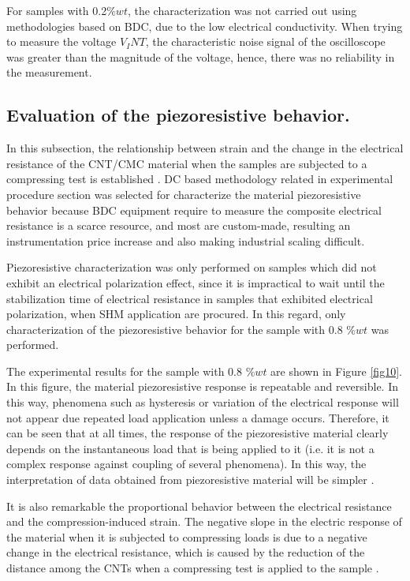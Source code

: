 \documentclass[twocolumn]{bmcart}%
\begin{document}
For samples with 0.2$\%wt$, the characterization was not carried out using methodologies based on BDC, due to the low electrical conductivity. When trying to measure the voltage $V_INT$, the characteristic noise signal of the oscilloscope was greater than the magnitude of the voltage, hence, there was no reliability in the measurement. 

\subsection{Evaluation of the piezoresistive behavior.}

In this subsection, the relationship between strain and the change in the electrical resistance of the CNT/CMC material when the samples are subjected to a compressing test is established . DC based methodology related in experimental procedure section  was selected for characterize the material piezoresistive behavior because BDC equipment require to measure the composite electrical resistance is a scarce resource, and most are custom-made, resulting an instrumentation price increase and also making industrial scaling difficult.

Piezoresistive characterization was only performed on samples which did not exhibit an electrical polarization effect, since it is impractical to wait until the stabilization time of electrical resistance in samples that exhibited electrical polarization, when SHM application are procured. In this regard, only characterization of the piezoresistive behavior for the sample with 0.8 $\%wt$ was performed.

The experimental results for the sample with 0.8 $\%wt$ are shown in Figure \ref{fig10}. In this figure, the material piezoresistive response is repeatable and reversible. In this way, phenomena such as hysteresis or variation of the electrical response will not appear due repeated load application unless a damage occurs.  Therefore, it can be seen that at all times, the response of the piezoresistive material clearly depends on the instantaneous load that is being applied to it (i.e. it is not a complex response against coupling of several phenomena). In this way, the interpretation of data obtained from piezoresistive material will be simpler \cite{Lagason2016}.

It is also remarkable the proportional behavior between the electrical resistance and the compression-induced strain. The negative slope in the electric response of the material when it is subjected to compressing loads is due to a negative change in the electrical resistance, which is caused by the reduction of the distance among the CNTs when a compressing test is applied to the sample \cite{DAlessandro2017}.
\end{document}
